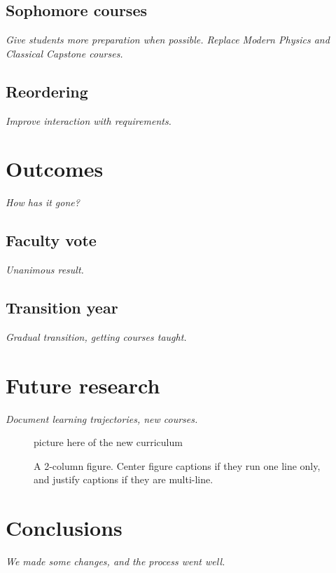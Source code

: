 \documentclass[english,aps,pra,reprint,noshowpacs,superscriptaddress]{revtex4-1}
\begin{document}
\subsection{Sophomore courses}
\emph{Give students more preparation when possible.  Replace Modern
  Physics and Classical Capstone courses.}
\subsection{Reordering}
\emph{Improve interaction with requirements.}

\section{Outcomes}
\emph{How has it gone?}

\subsection{Faculty vote}
\emph{Unanimous result.}
\subsection{Transition year}
\emph{Gradual transition, getting courses taught.}

\section{Future research}
\emph{Document learning trajectories, new courses.}


\begin{figure}
  picture here of the new curriculum
\caption{A 2-column figure. Center figure captions if they run one
  line only, and justify captions if they are multi-line.\label{fig2}}
\end{figure}



\section{Conclusions}
\emph{We made some changes, and the process went well.}


\end{document}
